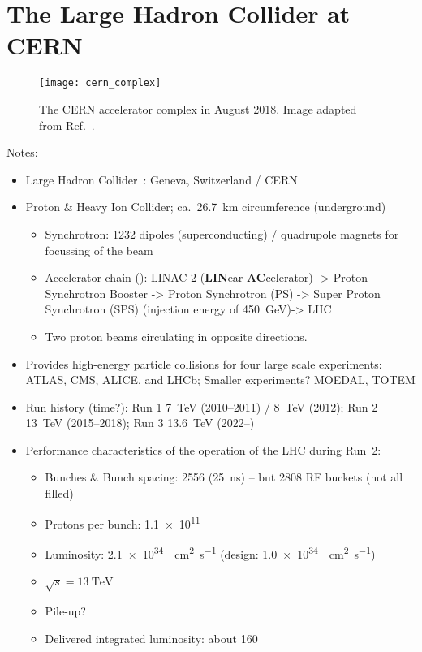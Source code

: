 \section{The Large Hadron Collider at CERN}

\begin{figure}[htbp]
  \centering

  \texttt{[image: cern\_complex]}

  \caption{The CERN accelerator complex in August 2018. Image adapted from
    Ref.~\cite{Mobs:2684277}.}%
  \label{fig:bla}
\end{figure}

Notes:
\begin{itemize}

\item Large Hadron Collider~\cite{Evans:2008zzb}: Geneva, Switzerland / CERN

\item Proton \& Heavy Ion Collider; ca.\ \SI{26.7}{\kilo\metre} circumference
  (underground)
  \begin{itemize}

  \item Synchrotron: 1232 dipoles (superconducting) / quadrupole magnets for
    focussing of the beam

  \item Accelerator chain (\pp): LINAC 2 (\textbf{LIN}ear \textbf{AC}celerator)
    -> Proton Synchrotron Booster -> Proton Synchrotron (PS) -> Super Proton
    Synchrotron (SPS) (injection energy of \SI{450}{\GeV})-> LHC

  \item Two proton beams circulating in opposite directions.

  \end{itemize}

\item Provides high-energy particle collisions for four large scale experiments:
  ATLAS, CMS, ALICE, and LHCb; Smaller experiments? MOEDAL, TOTEM

\item Run history (time?): Run 1 \SI{7}{\TeV} (2010--2011) / \SI{8}{\TeV}
  (2012); Run 2 \SI{13}{\TeV} (2015--2018); Run 3 \SI{13.6}{\TeV} (2022--)

\item Performance characteristics of the \pp operation of the LHC during Run~2:
  \begin{itemize}
  \item Bunches \& Bunch spacing: 2556 (\SI{25}{\nano\second}) -- but 2808 RF
    buckets (not all filled)
  \item Protons per bunch: \num{1.1e11}
  \item Luminosity: \SI{2.1e34}{\per\centi\metre\squared\per\second} (design:
    \SI{1.0e34}{\per\centi\metre\squared\per\second})
  \item $\sqrt{s} = \SI{13}{\TeV}$
  \item Pile-up?
  \item Delivered integrated luminosity: about \SI{160}{\ifb}
  \end{itemize}


\end{itemize}
